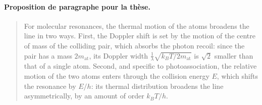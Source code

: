 \documentclass[11pt]{article}
\begin{document}
\paragraph{Proposition de paragraphe pour la thèse.}
\begin{quote}\small
For molecular resonances, the thermal motion of the atoms broadens the line in two
ways. First, the Doppler shift is set by the motion of the centre of mass of the
colliding pair, which absorbs the photon recoil: since the pair has a mass
$2m_{\text{at}}$, its Doppler width $\frac{1}{\lambda}\sqrt{k_BT/2m_{\text{at}}}$ is $\sqrt2$
smaller than that of a single atom. Second, and specific to photoassociation, the
relative motion of the two atoms enters through the collision energy $E$, which shifts
the resonance by $E/h$: its thermal distribution broadens the line asymmetrically, by
an amount of order $k_BT/h$.
\end{quote}
\end{document}
